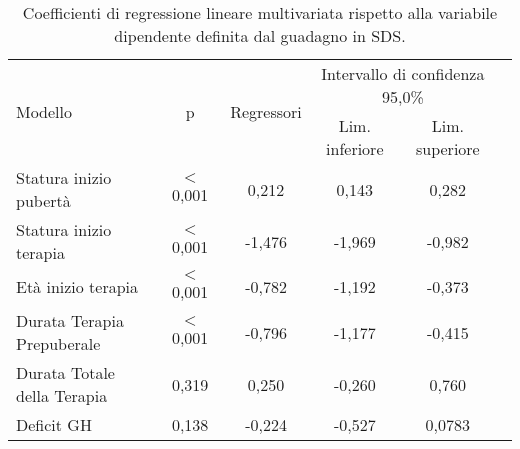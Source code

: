 \begin{table}[!h]
\begin{center}
\addtolength{\tabcolsep}{-2pt}
\begin{tabular}{l c c c c c}
\toprule
\multirow{2}{*}{Modello}	& \multirow{2}{*}{p} & \multirow{2}{*}{Regressori} & \multicolumn{2}{c}{Intervallo di confidenza 95,0\%} \\
\cmidrule(r){4-5}
				& 		&	& Lim. inferiore & Lim. superiore \\
\midrule                	                	
Statura inizio pubertà		& $<$ 0,001	& 0,212	& 0,143	  & 0,282 \\
Statura inizio terapia		& $<$ 0,001	&-1,476	& -1,969  & -0,982 \\
Età inizio terapia		& $<$ 0,001	&-0,782	& -1,192  & -0,373 \\
Durata Terapia Prepuberale	& $<$ 0,001	&-0,796	& -1,177  & -0,415 \\
Durata Totale della Terapia	& 0,319		& 0,250	& -0,260  & 0,760 \\
Deficit GH			& 0,138		&-0,224	& -0,527  & 0,0783 \\ 
\bottomrule
\end{tabular} 
\end{center}
\caption{Coefficienti di regressione lineare multivariata rispetto alla variabile dipendente definita dal guadagno in SDS.}
\label{tab:Statistiche}
\end{table}


